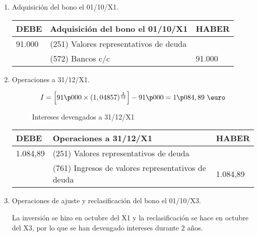     \begin{enumerate}[label=\textbf{\alph*})]
        \item Adquisición del bono el 01/10/X1.
        
        \begin{table}[H]
            \centering
            \begin{tabular}{|p{3cm}|p{6cm}|p{3cm}|}
            \hline
            \rowcolor{blue!30}
            \textbf{DEBE} & \textbf{Adquisición del bono el 01/10/X1} & \textbf{HABER} \\
            \hline
            91.000 & (251) Valores representativos de deuda & \\
            \hline
            & (572) Bancos c/c & 91.000 \\
            \hline
            \end{tabular}
        \end{table}

        \item Operaciones a 31/12/X1.
        
        \begin{figure}[H]
            \begin{equation*}
                I = \left[91\p000 \times (1,04857)^{\frac{3}{12}}\right] - 91\p000 = 1\p084,89 \text{ \euro}
            \end{equation*}
            \caption{Intereses devengados a 31/12/X1}
        \end{figure}

        \begin{table}[H]
            \centering
            \begin{tabular}{|p{3cm}|p{6cm}|p{3cm}|}
            \hline
            \rowcolor{blue!30}
            \textbf{DEBE} & \textbf{Operaciones a 31/12/X1} & \textbf{HABER} \\
            \hline
            1.084,89 & (251) Valores representativos de deuda & \\
            \hline
            & (761) Ingresos de valores representativos de deuda & 1.084,89 \\
            \hline
            \end{tabular}
        \end{table}

        \item Operaciones de ajuste y reclasificación del bono el 01/10/X3.
        
        La inversión se hizo en octubre del X1 y la reclasificación se hace en octubre del X3, por lo que se han devengado intereses durante 2 años.


\end{enumerate}
